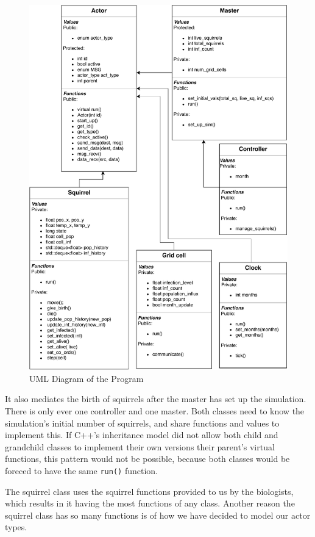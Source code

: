 \documentclass[oneside]{article}
\begin{document}
\begin{figure}[H]
  \includegraphics[width=\linewidth]{figures/pdp_uml}
  \caption{UML Diagram of the Program}
  \label{fig:uml}
\end{figure}
It also mediates the birth of squirrels after the master has set up the simulation. There is only ever one controller and one master. Both classes need to know the simulation's initial number of squirrels, and share functions and values to implement this. If C++'s inheritance model did not allow both child and grandchild classes to implement their own versions their parent's virtual functions, this pattern would not be possible, because both classes would be foreced to have the same \texttt{run()} function.

The squirrel class uses the squirrel functions provided to us by the biologists, which results in it having the most functions of any class. Another reason the squirrel class has so many functions is of how we have decided to model our actor types.
\end{document}
